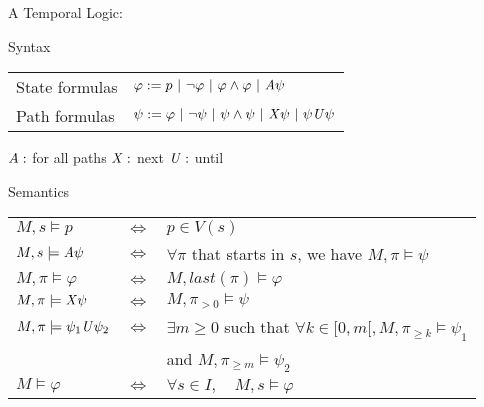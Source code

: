\begin{frame}{A Temporal Logic: \ctls}

  \begin{block}{Syntax}
    \begin{tabular}{l l}
      State formulas & $\varphi := p ~|~ \neg \varphi ~|~ \varphi\wedge\varphi ~|~ \mathit{A}\psi$\\
      Path formulas & $\psi := \varphi ~|~ \neg\psi ~|~ \psi\wedge\psi ~|~ \mathit{X}\psi ~|~ \psi\mathit{U}\psi$\\
    \end{tabular}
    
      $\mathit{A}:$ for all paths\hfill
      $\mathit{X}:$ next\hfill
      $\mathit{U}:$ until\hfill
  \end{block}
  \vfill
  \begin{block}{Semantics}
    \begin{tabular}{l c l}
      $M,s \models p $&$ \iff $&$ p\in V(s)$\\
      $M,s \models \mathit{A}\psi  $&$ \iff $&$ \forall\pi$ that starts in $s$, we have $M,\pi\models\psi$\\
      $M,\pi\models\varphi $&$ \iff $&$ M,\mathit{last}(\pi)\models\varphi$\\
      $M,\pi\models\mathit{X}\psi $&$ \iff $&$  M,\pi_{> 0}\models\psi$\\
      $M,\pi\models\psi_1\mathit{U}\psi_2 $&$ \iff $&$ \exists m\geq 0$ such that $\forall k\in[0,m[, M,\pi_{\geq k}\models\psi_1$\\
          & & and $M,\pi_{\geq m}\models\psi_2$\\
          \hline
      $M\models\varphi$&$ \iff $&$\forall s\in I, \quad M,s\models\varphi$
\end{tabular}
  \end{block}
  
\end{frame}


